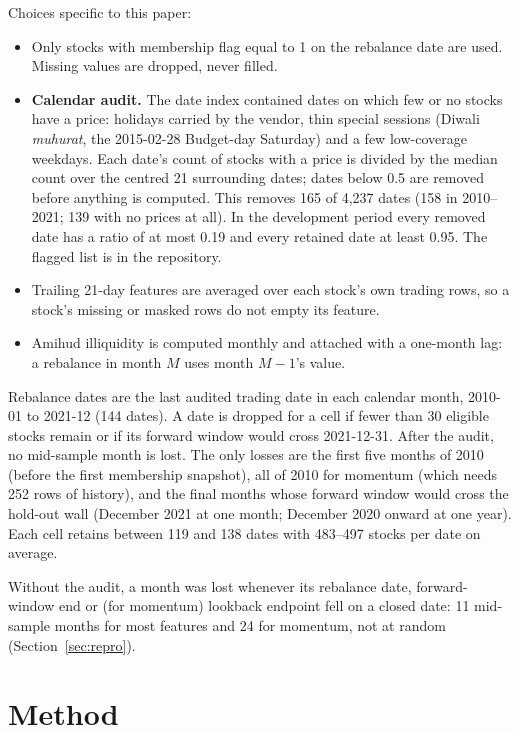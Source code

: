 \documentclass[11pt]{article}
\begin{document}
Choices specific to this paper:
\begin{itemize}
\item Only stocks with membership flag equal to 1 on the rebalance date are used.
Missing values are dropped, never filled.
\item \textbf{Calendar audit.} The date index contained dates on which few or no
stocks have a price: holidays carried by the vendor, thin special sessions (Diwali
\emph{muhurat}, the 2015-02-28 Budget-day Saturday) and a few low-coverage weekdays.
Each date's count of stocks with a price is divided by the median count over the
centred 21 surrounding dates; dates below 0.5 are removed before anything is computed.
This removes 165 of 4,237 dates (158 in 2010--2021; 139 with no prices at all). In the
development period every removed date has a ratio of at most 0.19 and every retained
date at least 0.95. The flagged list is in the repository.
\item Trailing 21-day features are averaged over each stock's own trading rows, so
a stock's missing or masked rows do not empty its feature.
\item Amihud illiquidity \citep{amihud2002} is computed monthly and attached with a
one-month lag: a rebalance in month $M$ uses month $M-1$'s value.
\end{itemize}

Rebalance dates are the last audited trading date in each calendar month, 2010-01 to
2021-12 (144 dates). A date is dropped for a cell if fewer than 30 eligible stocks
remain or if its forward window would cross 2021-12-31. After the audit, no
mid-sample month is lost. The only losses are the first five months of 2010 (before the
first membership snapshot), all of 2010 for momentum (which needs 252 rows of
history), and the final months whose forward window would cross the hold-out wall
(December 2021 at one month; December 2020 onward at one year). Each cell retains
between 119 and 138 dates with 483--497 stocks per date on average.

Without the audit, a month was lost whenever its rebalance date, forward-window end
or (for momentum) lookback endpoint fell on a closed date: 11 mid-sample months for most
features and 24 for momentum, not at random (Section~\ref{sec:repro}).

\section{Method}
\end{document}
